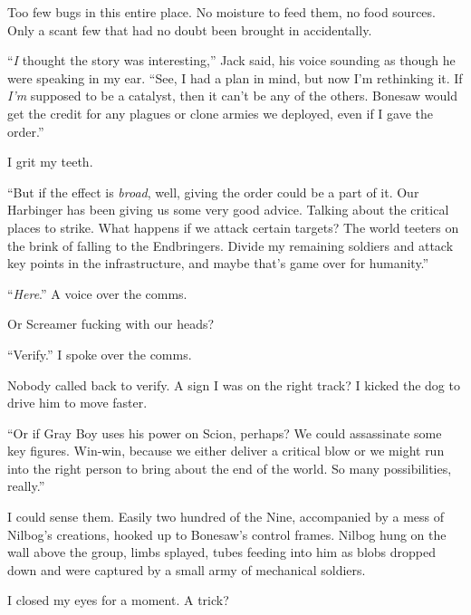 Too few bugs in this entire place.  No moisture to feed them, no food sources.  Only a scant few that had no doubt been brought in accidentally.



``\emph{I} thought the story was interesting,'' Jack said, his voice sounding as though he were speaking in my ear.  ``See, I had a plan in mind, but now I'm rethinking it.  If \emph{I'm} supposed to be a catalyst, then it can't be any of the others.  Bonesaw would get the credit for any plagues or clone armies we deployed, even if I gave the order.''



I grit my teeth.



``But if the effect is \emph{broad}, well, giving the order could be a part of it.  Our Harbinger has been giving us some very good advice.  Talking about the critical places to strike.  What happens if we attack certain targets?  The world teeters on the brink of falling to the Endbringers.  Divide my remaining soldiers and attack key points in the infrastructure, and maybe that's game over for humanity.''



``\emph{Here}.''  A voice over the comms.



Or Screamer fucking with our heads?



``Verify.'' I spoke over the comms.



Nobody called back to verify.  A sign I was on the right track?  I kicked the dog to drive him to move faster.



``Or if Gray Boy uses his power on Scion, perhaps?  We could assassinate some key figures.  Win-win, because we either deliver a critical blow or we might run into the right person to bring about the end of the world.  So many possibilities, really.''



I could sense them.  Easily two hundred of the Nine, accompanied by a mess of Nilbog's creations, hooked up to Bonesaw's control frames.  Nilbog hung on the wall above the group, limbs splayed, tubes feeding into him as blobs dropped down and were captured by a small army of mechanical soldiers.



I closed my eyes for a moment.  A trick?



